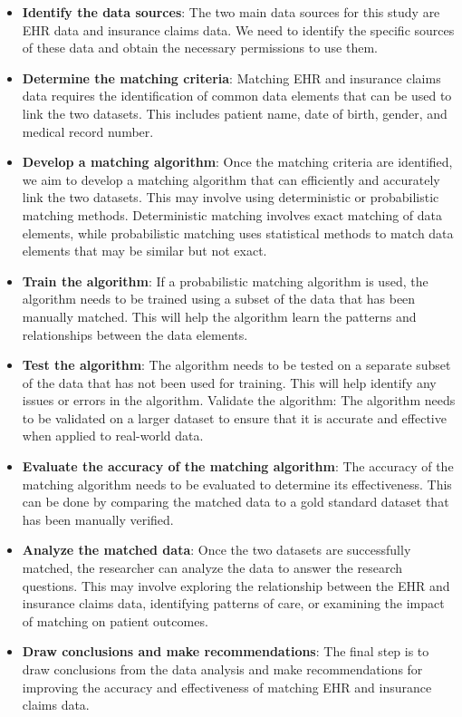 \documentclass[11pt,]{article}
\providecommand{\tightlist}{%
  \setlength{\itemsep}{0pt}\setlength{\parskip}{0pt}}
\begin{document}
\begin{itemize}
\tightlist
\item
  \textbf{Identify the data sources}: The two main data sources for this
  study are EHR data and insurance claims data. We need to identify the
  specific sources of these data and obtain the necessary permissions to
  use them.
\item
  \textbf{Determine the matching criteria}: Matching EHR and insurance
  claims data requires the identification of common data elements that
  can be used to link the two datasets. This includes patient name, date
  of birth, gender, and medical record number.
\item
  \textbf{Develop a matching algorithm}: Once the matching criteria are
  identified, we aim to develop a matching algorithm that can
  efficiently and accurately link the two datasets. This may involve
  using deterministic or probabilistic matching methods. Deterministic
  matching involves exact matching of data elements, while probabilistic
  matching uses statistical methods to match data elements that may be
  similar but not exact.
\item
  \textbf{Train the algorithm}: If a probabilistic matching algorithm is
  used, the algorithm needs to be trained using a subset of the data
  that has been manually matched. This will help the algorithm learn the
  patterns and relationships between the data elements.
\item
  \textbf{Test the algorithm}: The algorithm needs to be tested on a
  separate subset of the data that has not been used for training. This
  will help identify any issues or errors in the algorithm. Validate the
  algorithm: The algorithm needs to be validated on a larger dataset to
  ensure that it is accurate and effective when applied to real-world
  data.
\item
  \textbf{Evaluate the accuracy of the matching algorithm}: The accuracy
  of the matching algorithm needs to be evaluated to determine its
  effectiveness. This can be done by comparing the matched data to a
  gold standard dataset that has been manually verified.
\item
  \textbf{Analyze the matched data}: Once the two datasets are
  successfully matched, the researcher can analyze the data to answer
  the research questions. This may involve exploring the relationship
  between the EHR and insurance claims data, identifying patterns of
  care, or examining the impact of matching on patient outcomes.
\item
  \textbf{Draw conclusions and make recommendations}: The final step is
  to draw conclusions from the data analysis and make recommendations
  for improving the accuracy and effectiveness of matching EHR and
  insurance claims data.
\end{itemize}
\end{document}
